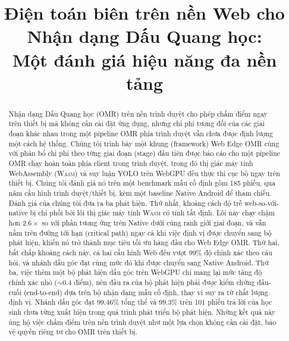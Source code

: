 \documentclass[conference]{IEEEtran}
\newcommand{\wasm}{\textnormal{\textsc{Wasm}}}
\begin{document}
\title{Điện toán biên trên nền Web cho Nhận dạng Dấu Quang học:\protect\\
Một đánh giá hiệu năng đa nền tảng}

\author{
}

\maketitle

\begin{abstract}
Nhận dạng Dấu Quang học (OMR) trên nền trình duyệt cho phép chấm điểm ngay
trên thiết bị mà không cần cài đặt ứng dụng, nhưng chi phí tương đối của các
giai đoạn khác nhau trong một pipeline OMR phía trình duyệt vẫn chưa được định
lượng một cách hệ thống. Chúng tôi trình bày một khung (framework) Web Edge OMR
cùng với phân bổ chi phí theo từng giai đoạn (stage) đầu tiên được báo cáo cho
một pipeline OMR chạy hoàn toàn phía client trong trình duyệt, trong đó thị giác
máy tính WebAssembly (\wasm{}) và suy luận YOLO trên WebGPU đều thực thi cục bộ
ngay trên thiết bị. Chúng tôi đánh giá nó trên một benchmark mẫu cố định gồm 185
phiếu, qua năm cấu hình trình duyệt/thiết bị, kèm một baseline Native Android để
tham chiếu.
Đánh giá của chúng tôi đưa ra ba phát hiện. Thứ nhất, khoảng cách độ trễ
web-so-với-native bị chi phối bởi lõi thị giác máy tính \wasm{} có tính tất định.
Lõi này chạy chậm hơn $2.6\times$ so với phần tương ứng trên Native dưới cùng
ranh giới giai đoạn, và vẫn nằm trên đường tới hạn (critical path) ngay cả khi
việc định vị được chuyển sang bộ phát hiện, khiến nó trở thành mục tiêu tối ưu
hàng đầu cho Web Edge OMR. Thứ hai, bất chấp khoảng cách này, cả hai cấu hình
Web đều vượt $99\%$ độ chính xác theo câu hỏi, và nhánh dấu góc đạt cùng mức đó
khi được chuyển sang Native Android.
Thứ ba, việc thêm một bộ phát hiện dấu góc trên WebGPU chỉ mang lại mức tăng độ
chính xác nhỏ ($\sim\!0.4$ điểm), nên đầu ra của bộ phát hiện phải được kiểm
chứng đầu-cuối (end-to-end) dựa trên bộ nhận dạng mẫu cố định, thay vì suy ra từ
chất lượng định vị. Nhánh dấu góc đạt $99.46\%$ tổng thể và $99.3\%$ trên 101
phiếu trả lời của học sinh chưa từng xuất hiện trong quá trình phát triển bộ phát
hiện.
Những kết quả này ủng hộ việc chấm điểm trên nền trình duyệt như một lựa chọn
không cần cài đặt, bảo vệ quyền riêng tư cho OMR trên thiết bị.
\end{abstract}
\end{document}
